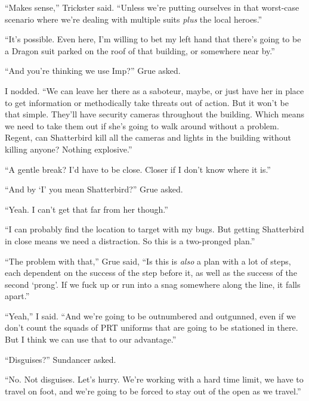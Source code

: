``Makes sense,'' Trickster said.  ``Unless we're putting ourselves in that worst-case scenario where we're dealing with multiple suits \emph{plus} the local heroes.''



``It's possible.  Even here, I'm willing to bet my left hand that there's going to be a Dragon suit parked on the roof of that building, or somewhere near by.''



``And you're thinking we use Imp?''  Grue asked.



I nodded.  ``We can leave her there as a saboteur, maybe, or just have her in place to get information or methodically take threats out of action.  But it won't be that simple.  They'll have security cameras throughout the building.  Which means we need to take them out if she's going to walk around without a problem.  Regent, can Shatterbird kill all the cameras and lights in the building without killing anyone?  Nothing explosive.''



``A gentle break?  I'd have to be close.  Closer if I don't know where it is.''



``And by `I' you mean Shatterbird?'' Grue asked.



``Yeah.  I can't get that far from her though.''



``I can probably find the location to target with my bugs.  But getting Shatterbird in close means we need a distraction.  So this is a two-pronged plan.''



``The problem with that,'' Grue said, ``Is this is \emph{also} a plan with a lot of steps, each dependent on the success of the step before it, as well as the success of the second `prong'.  If we fuck up or run into a snag somewhere along the line, it falls apart.''



``Yeah,'' I said.  ``And we're going to be outnumbered and outgunned, even if we don't count the squads of PRT uniforms that are going to be stationed in there.\emph{  }But I think we can use that to our advantage.''



``Disguises?'' Sundancer asked.



``No.  Not disguises.  Let's hurry.  We're working with a hard time limit, we have to travel on foot, and we're going to be forced to stay out of the open as we travel.''



